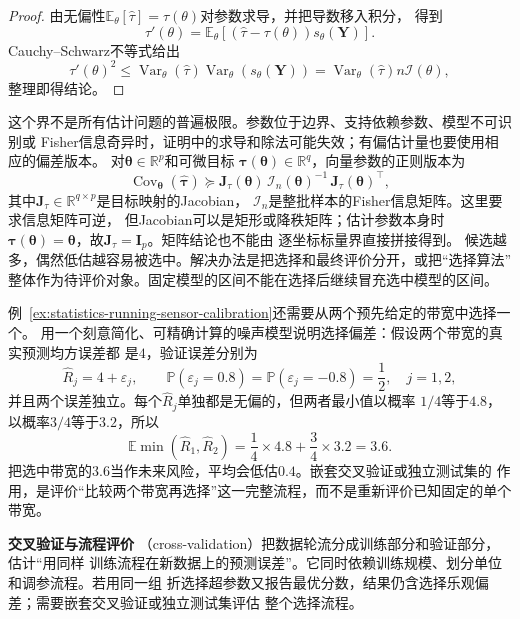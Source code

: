 \begin{proof}
由无偏性\(\mathbb{E}_\theta[\widehat\tau]=\tau(\theta)\)对参数求导，并把导数移入积分，
得到
\[
  \tau'(\theta)
  =\mathbb{E}_\theta[
    (\widehat\tau-\tau(\theta))s_\theta(\bm Y)].
\]
Cauchy--Schwarz不等式给出
\[
  \tau'(\theta)^2\leq
  \operatorname{Var}_\theta(\widehat\tau)
  \operatorname{Var}_\theta(s_\theta(\bm Y))
  =
  \operatorname{Var}_\theta(\widehat\tau)n\mathcal I(\theta),
\]
整理即得结论。
\end{proof}

这个界不是所有估计问题的普遍极限。参数位于边界、支持依赖参数、模型不可识别或
Fisher信息奇异时，证明中的求导和除法可能失效；有偏估计量也要使用相应的偏差版本。
对\(\bm\theta\in\mathbb{R}^p\)和可微目标
\(\bm\tau(\bm\theta)\in\mathbb{R}^q\)，向量参数的正则版本为
\[
  \operatorname{Cov}_{\bm\theta}(\widehat{\bm\tau})
  \succeq
  \bm J_\tau(\bm\theta)\,
  \bm{\mathcal I}_n(\bm\theta)^{-1}\,
  \bm J_\tau(\bm\theta)^\top,
\]
其中\(\bm J_\tau\in\mathbb{R}^{q\times p}\)是目标映射的Jacobian，
\(\bm{\mathcal I}_n\)是整批样本的Fisher信息矩阵。这里要求信息矩阵可逆，
但Jacobian可以是矩形或降秩矩阵；估计参数本身时
\(\bm\tau(\bm\theta)=\bm\theta\)，故\(\bm J_\tau=\bm I_p\)。矩阵结论也不能由
逐坐标标量界直接拼接得到。
候选越多，偶然低估越容易被选中。解决办法是把选择和最终评价分开，或把“选择算法”
整体作为待评价对象。固定模型的区间不能在选择后继续冒充选中模型的区间。

例~\ref{ex:statistics-running-sensor-calibration}还需要从两个预先给定的带宽中选择一个。
用一个刻意简化、可精确计算的噪声模型说明选择偏差：假设两个带宽的真实预测均方误差都
是\(4\)，验证误差分别为
\[
  \widehat R_j=4+\varepsilon_j,\qquad
  \mathbb{P}(\varepsilon_j=0.8)
  =\mathbb{P}(\varepsilon_j=-0.8)=\frac12,
  \quad j=1,2,
\]
并且两个误差独立。每个\(\widehat R_j\)单独都是无偏的，但两者最小值以概率
\(1/4\)等于\(4.8\)，以概率\(3/4\)等于\(3.2\)，所以
\[
  \mathbb{E}\min(\widehat R_1,\widehat R_2)
  =\frac14\times4.8+\frac34\times3.2
  =3.6.
\]
把选中带宽的\(3.6\)当作未来风险，平均会低估\(0.4\)。嵌套交叉验证或独立测试集的
作用，是评价“比较两个带宽再选择”这一完整流程，而不是重新评价已知固定的单个带宽。

\par\medskip\noindent\textbf{交叉验证与流程评价}\quad
{}（cross-validation）把数据轮流分成训练部分和验证部分，估计“用同样
训练流程在新数据上的预测误差”。它同时依赖训练规模、划分单位和调参流程。若用同一组
折选择超参数又报告最优分数，结果仍含选择乐观偏差；需要嵌套交叉验证或独立测试集评估
整个选择流程。


